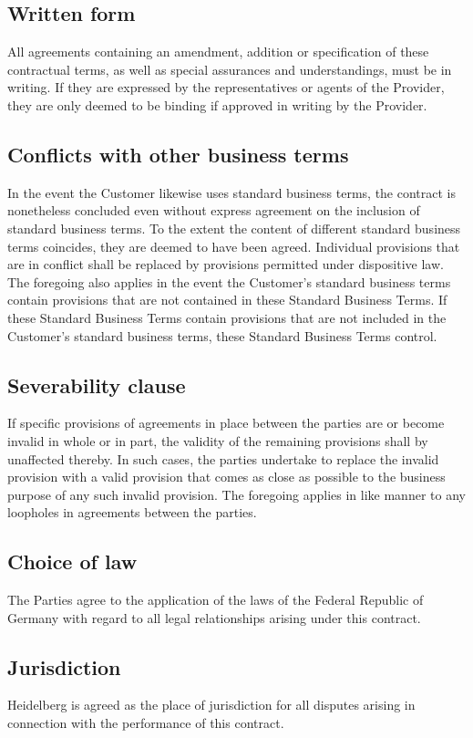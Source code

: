 \documentclass{terms}
\begin{document}
\subsection{Written form}
All agreements containing an amendment, addition or specification of these contractual terms, as well as special assurances and understandings, must be in writing. If they are expressed by the representatives or agents of the Provider, they are only deemed to be binding if approved in writing by the Provider.
\subsection{Conflicts with other business terms}
In the event the Customer likewise uses standard business terms, the contract is nonetheless concluded even without express agreement on the inclusion of standard business terms. To the extent the content of different standard business terms coincides, they are deemed to have been agreed. Individual provisions that are in conflict shall be replaced by provisions permitted under dispositive law. The foregoing also applies in the event the Customer's standard business terms contain provisions that are not contained in these Standard Business Terms. If these Standard Business Terms contain provisions that are not included in the Customer's standard business terms, these Standard Business Terms control.
\subsection{Severability clause}
If specific provisions of agreements in place between the parties are or become invalid in whole or in part, the validity of the remaining provisions shall by unaffected thereby. In such cases, the parties undertake to replace the invalid provision with a valid provision that comes as close as possible to the business purpose of any such invalid provision. The foregoing applies in like manner to any loopholes in agreements between the parties.
\subsection{Choice of law}
The Parties agree to the application of the laws of the Federal Republic of Germany with regard to all legal relationships arising under this contract.
\subsection{Jurisdiction}
Heidelberg is agreed as the place of jurisdiction for all disputes arising in connection with the performance of this contract.
\end{document}

